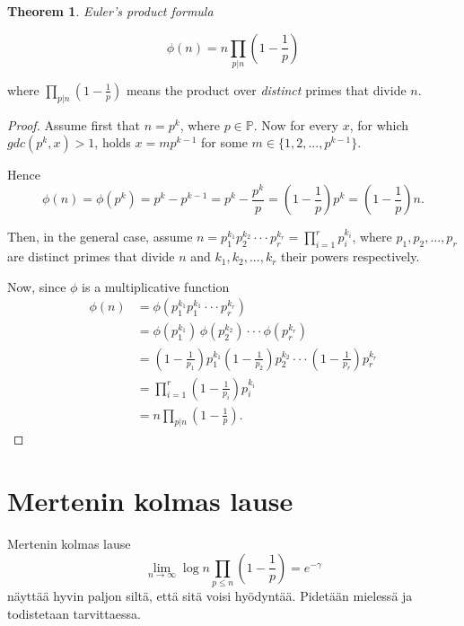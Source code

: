 \documentclass{article}
\theoremstyle{definition}
\newtheorem{theorem}[subsection]{Theorem}
\begin{document}
\begin{theorem}{\emph{Euler's product formula}}

\begin{equation*}
    \phi(n) = n \prod_{p \vert n} \left(1 - \frac{1}{p}\right)
\end{equation*}

where $\prod_{p \vert n} (1 - \frac{1}{p})$ means the product over \emph{distinct} primes that divide $n$.

\begin{proof}

Assume first that $n = p^k$, where $p\in \mathbb{P}$. Now for every $x$, for which $gdc(p^k,x)>1$, holds $x=mp^{k-1}$ for some $m\in \{1,2,...,p^{k-1}\}$.


Hence
\begin{equation*}
    \phi(n)=\phi(p^k)=p^k-p^{k-1}=p^k-\frac{p^k}{p}=\left(1-\frac{1}{p}\right)p^k=\left(1-\frac{1}{p}\right)n.
\end{equation*}

Then, in the general case, assume $n=p_1^{k_1} p_2^{k_2} \cdot \cdot \cdot p_r^{k_r}=\prod_{i=1}^r p_i^{k_i}$, where $p_1,p_2,...,p_r$ are distinct primes that divide $n$ and $k_1,k_2,...,k_r$ their powers respectively. 


Now, since $\phi$ is a multiplicative function
\begin{align*}
    \phi(n) & = \phi(p_1^{k_1} p_1^{k_1} \cdot \cdot \cdot p_r^{k_r})\\
    & = \phi(p_1^{k_1})\,\phi(p_2^{k_2}) \cdot \cdot \cdot \phi(p_r^{k_r})\\
    & = \left(1-\frac{1}{p_1}\right)p_1^{k_1} \left(1-\frac{1}{p_2}\right)p_2^{k_2} \cdot \cdot \cdot \left(1-\frac{1}{p_r}\right)p_r^{k_r}\\
    & = \prod_{i=1}^r \left(1-\frac{1}{p_i}\right) p_i^{k_i}\\
    & = n \prod_{p \vert n} \left(1 - \frac{1}{p}\right).
\end{align*}

\end{proof}

\end{theorem}

\section{Mertenin kolmas lause}

Mertenin kolmas lause
\begin{equation*}
    \lim_{n \rightarrow \infty} \log n \prod_{p\leq n} \left(1-\frac{1}{p}\right) = e^{-\gamma}
\end{equation*}
näyttää hyvin paljon siltä, että sitä voisi hyödyntää. Pidetään mielessä ja todistetaan tarvittaessa.
\end{document}
